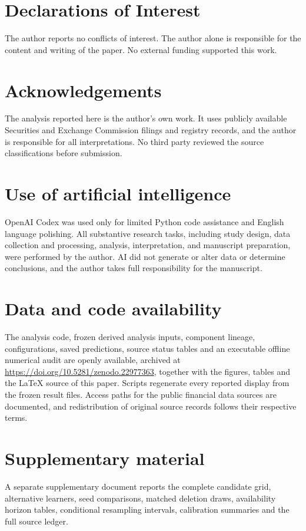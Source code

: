 \documentclass[10pt,a4paper,twocolumn]{article}
\begin{document}
\section*{Declarations of Interest}
The author reports no conflicts of interest. The author alone is responsible for the content and writing of the paper. No external funding supported this work.
\section*{Acknowledgements}
The analysis reported here is the author’s own work. It uses publicly available Securities and Exchange Commission filings and registry records, and the author is responsible for all interpretations. No third party reviewed the source classifications before submission.
\section*{Use of artificial intelligence}
OpenAI Codex was used only for limited Python code assistance and English language polishing. All substantive research tasks, including study design, data collection and processing, analysis, interpretation, and manuscript preparation, were performed by the author. AI did not generate or alter data or determine conclusions, and the author takes full responsibility for the manuscript.
\section*{Data and code availability}
The analysis code, frozen derived analysis inputs, component lineage, configurations, saved predictions, source status tables and an executable offline numerical audit are openly available, archived at \url{https://doi.org/10.5281/zenodo.22977363}, together with the figures, tables and the LaTeX source of this paper. Scripts regenerate every reported display from the frozen result files. Access paths for the public financial data sources are documented, and redistribution of original source records follows their respective terms.
\section*{Supplementary material}
A separate supplementary document reports the complete candidate grid, alternative learners, seed comparisons, matched deletion draws, availability horizon tables, conditional resampling intervals, calibration summaries and the full source ledger.
\end{document}
